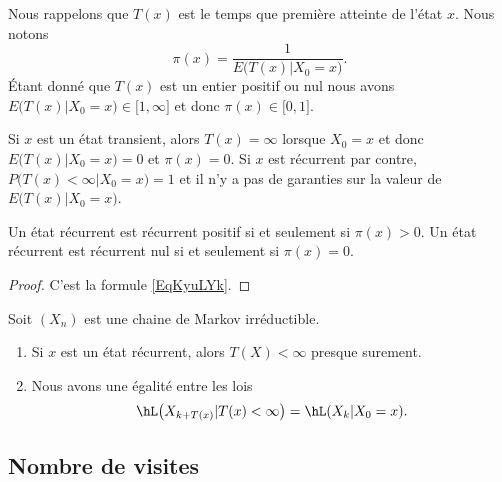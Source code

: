 Nous rappelons que \( T(x)\) est le temps que première atteinte de l'état \( x\). Nous notons
\begin{equation}        \label{EqKyuLYk}
	\pi(x)=\frac{1}{ E\big( T(x)|X_0=x \big) }.
\end{equation}
Étant donné que \( T(x)\) est un entier positif ou nul nous avons \( E\big( T(x)|X_0=x \big)\in\mathopen[ 1 , \infty \mathclose]\) et donc \( \pi(x)\in\mathopen[ 0 , 1 \mathclose]\).

Si \( x\) est un état transient, alors \( T(x)=\infty\) lorsque \( X_0=x\) et donc \( E\big( T(x)|X_0=x \big)=0\) et \( \pi(x)=0\). Si \( x\) est récurrent par contre, \( P\big( T(x)<\infty|X_0=x \big)=1\) et il n'y a pas de garanties sur la valeur de \( E\big( T(x)|X_0=x \big)\).

\begin{corollary}       \label{CorLhpRsk}
	Un état récurrent est récurrent positif si et seulement si \( \pi(x)>0\). Un état récurrent est récurrent nul si et seulement si \( \pi(x)=0\).
\end{corollary}

\begin{proof}
	C'est la formule \eqref{EqKyuLYk}.
\end{proof}

\begin{proposition} \label{PropMrkIrreLoishLCkpjkptXk}
	Soit \( (X_n)\) est une chaine de Markov irréductible.
	\begin{enumerate}
		\item
		      Si \( x\) est un état récurrent, alors \( T(X)<\infty\) presque surement.
		\item
		      Nous avons une égalité entre les lois
		      \begin{equation}    \label{PropMrkIrreLoishLCkpjkptXkItemii}
			      \hL\big( X_{k+T(x)}|T(x)<\infty \big)=\hL(X_k|X_0=x).
		      \end{equation}
	\end{enumerate}
\end{proposition}

\subsection{Nombre de visites}

